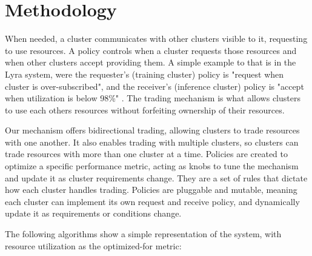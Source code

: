 \section{Methodology}
\vspace{1em}

\vspace{1em}
When needed, a cluster communicates with other clusters visible to it, requesting to use resources. A policy 
controls when a cluster requests those resources and when other clusters accept providing them. 
A simple example to that is in the Lyra system, were the requester's (training cluster) policy is "request 
when cluster is over-subscribed", and the receiver's (inference cluster) policy is "accept when 
utilization is below 98\%" \cite{li_lyra_2023}. The trading mechanism is what allows clusters to use each others 
resources without forfeiting ownership of their resources. 

Our mechanism offers bidirectional trading, allowing clusters to trade resources with one another. It also 
enables trading with multiple clusters, so clusters can trade resources with more than one cluster at a time. \label{sched-overhead} 
Policies are created to optimize a specific performance metric, acting as knobs to 
tune the mechanism and update it as cluster requirements change. They are a set of rules that dictate how each 
cluster handles trading. Policies are pluggable and mutable, meaning each cluster can implement its own request and receive 
policy, and dynamically update it as requirements or conditions change.

The following algorithms show a simple representation of the system, with resource utilization as the 
optimized-for metric: \label{example}

